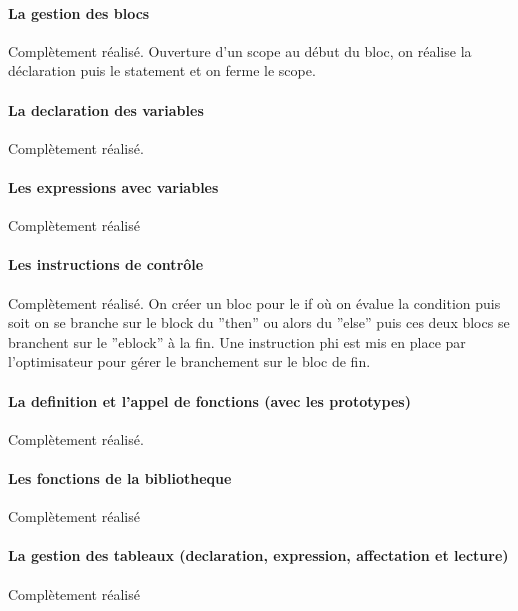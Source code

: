 \documentclass{article}
\begin{document}
\paragraph{La gestion des blocs}
Complètement réalisé.
Ouverture d'un scope au début du bloc, on réalise la déclaration puis le statement et on ferme le 
scope.

\paragraph{La declaration des variables}
Complètement réalisé.

\paragraph{Les expressions avec variables}
Complètement réalisé

\paragraph{Les instructions de contrôle }
Complètement réalisé.
On créer un bloc pour le if où on évalue la condition puis soit on se branche sur le block du ''then'' 
ou alors du ''else'' puis ces deux blocs se branchent sur le ''eblock'' à la
fin. Une instruction phi est mis en place par l'optimisateur pour gérer le
branchement sur le bloc de fin.

\paragraph{La definition et l'appel de fonctions (avec les prototypes)}
Complètement réalisé.


\paragraph{Les fonctions de la bibliotheque}
Complètement réalisé


\paragraph{La gestion des tableaux (declaration, expression, affectation et
  lecture)} 
Complètement réalisé
\end{document}
